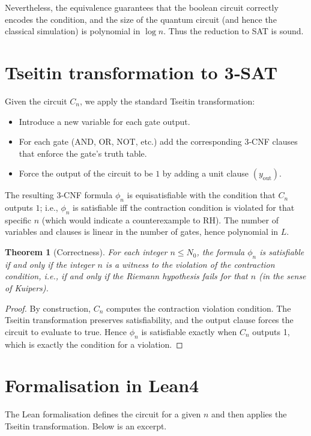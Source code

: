 \documentclass[11pt,a4paper]{article}
\newtheorem{theorem}{Theorem}[section]
\begin{document}
Nevertheless, the equivalence guarantees that the boolean circuit correctly encodes the condition, and the size of the quantum circuit (and hence the classical simulation) is polynomial in \(\log n\). Thus the reduction to SAT is sound.

\section{Tseitin transformation to 3‑SAT}

Given the circuit \(C_n\), we apply the standard Tseitin transformation:
\begin{itemize}
\item Introduce a new variable for each gate output.
\item For each gate (AND, OR, NOT, etc.) add the corresponding 3‑CNF clauses that enforce the gate’s truth table.
\item Force the output of the circuit to be \(1\) by adding a unit clause \((y_{\text{out}})\).
\end{itemize}

The resulting 3‑CNF formula \(\phi_n\) is equisatisfiable with the condition that \(C_n\) outputs \(1\); i.e., \(\phi_n\) is satisfiable iff the contraction condition is violated for that specific \(n\) (which would indicate a counterexample to RH). The number of variables and clauses is linear in the number of gates, hence polynomial in \(L\).

\begin{theorem}[Correctness]
\label{thm:correctness}
For each integer \(n \le N_0\), the formula \(\phi_n\) is satisfiable if and only if the integer \(n\) is a witness to the violation of the contraction condition, i.e., if and only if the Riemann hypothesis fails for that \(n\) (in the sense of Kuipers).
\end{theorem}
\begin{proof}
By construction, \(C_n\) computes the contraction violation condition. The Tseitin transformation preserves satisfiability, and the output clause forces the circuit to evaluate to true. Hence \(\phi_n\) is satisfiable exactly when \(C_n\) outputs 1, which is exactly the condition for a violation.
\end{proof}

\section{Formalisation in Lean4}

The Lean formalisation defines the circuit for a given \(n\) and then applies the Tseitin transformation. Below is an excerpt.
\end{document}
